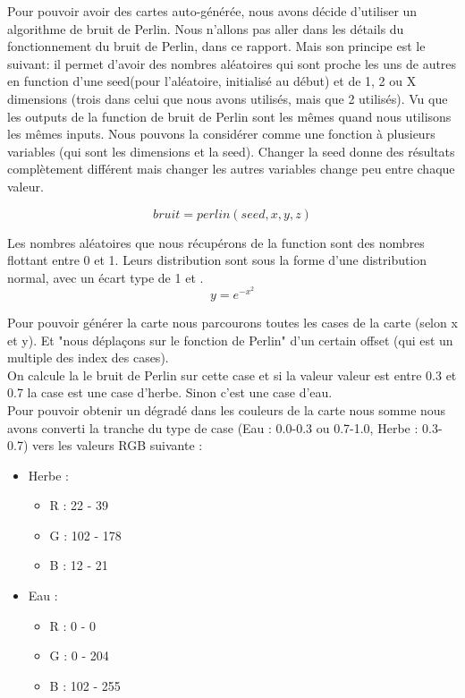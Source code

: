 \documentclass[a4paper,10pt,openany,oneside]{report}
\begin{document}
Pour pouvoir avoir des cartes auto-générée, nous avons décide d'utiliser un algorithme de bruit de Perlin. Nous n'allons pas aller dans les détails du fonctionnement du bruit de Perlin, dans ce rapport. Mais son principe est le suivant: il permet d'avoir des nombres aléatoires qui sont proche les uns de autres en function d'une seed(pour l'aléatoire, initialisé au début) et de 1, 2 ou X dimensions (trois dans celui que nous avons utilisés, mais que 2 utilisés). Vu que les outputs de la function de bruit de Perlin sont les mêmes quand nous utilisons les mêmes inputs. Nous pouvons la considérer comme une fonction à plusieurs variables (qui sont les dimensions et la seed). Changer la seed donne des résultats complètement différent mais changer les autres variables change peu entre chaque valeur.

\[bruit = perlin(seed, x, y, z)\]

Les nombres aléatoires que nous récupérons de la function sont des nombres flottant entre 0 et 1.
Leurs distribution sont sous la forme d'une distribution normal, avec un écart type de 1 et .
\[y=e^{-x^{2}}\]

Pour pouvoir générer la carte nous parcourons toutes les cases de la carte (selon x et y). Et "nous déplaçons sur le fonction de Perlin" d'un certain offset (qui est un multiple des index des cases). \\
On calcule la le bruit de Perlin sur cette case et si la valeur valeur est entre 0.3 et 0.7 la case est une case d'herbe. Sinon c'est une case d'eau. \\
Pour pouvoir obtenir un dégradé dans les couleurs de la carte nous somme nous avons converti la tranche du type de case (Eau : 0.0-0.3 ou 0.7-1.0, Herbe : 0.3-0.7) vers les valeurs RGB suivante :
\begin{itemize}
	\item Herbe :
	\begin{itemize}
		\item R : 22 - 39
		\item G : 102 - 178
		\item B : 12 - 21
	\end{itemize}
	\item Eau :
	\begin{itemize}
		\item R : 0 - 0
		\item G : 0 - 204
		\item B : 102 - 255
	\end{itemize}
\end{itemize}
\end{document}
